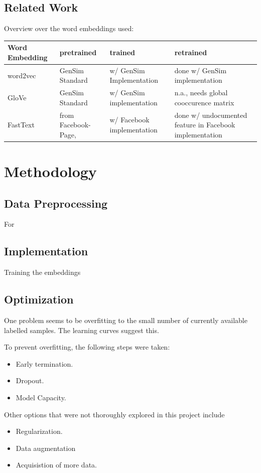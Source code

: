 \documentclass[10pt,a4paper]{article}
\begin{document}
	\subsection{Related Work}
	Overview over the word embeddings used:
	\begin{center}
		\begin{tabular}{|l|p{3cm}| p{3cm}| p{3cm}|}
			\hline
			\textbf{Word Embedding} & pretrained & trained & retrained \\ 
			\hline
			word2vec  & GenSim Standard & w/ GenSim Implementation & done w/ GenSim implementation \\  
			\hline
			GloVe & GenSim Standard &w/ GenSim implementation & n.a., needs global cooccurence matrix \\  
			\hline
			FastText & from Facebook-Page,  & w/ Facebook implementation & done w/ undocumented feature in Facebook implementation\\
			\hline
			 	
			
			
		\end{tabular}
	\end{center}
	\section{Methodology}
	\subsection{Data Preprocessing}
	For 
	\subsection{Implementation}
	Training the embeddings
	
	\subsection{Optimization}
	One problem seems to be overfitting to the small number of currently available labelled samples. The learning curves suggest this.
	
	To prevent overfitting, the following steps were taken:
	\begin{itemize}
		\item Early termination.
		\item Dropout. 
		\item Model Capacity. 
	\end{itemize}
    Other options that were not thoroughly explored in this project include
	\begin{itemize}
		\item Regularization.
		\item Data augmentation
		\item Acquisistion of more data.
	\end{itemize}
\end{document}

